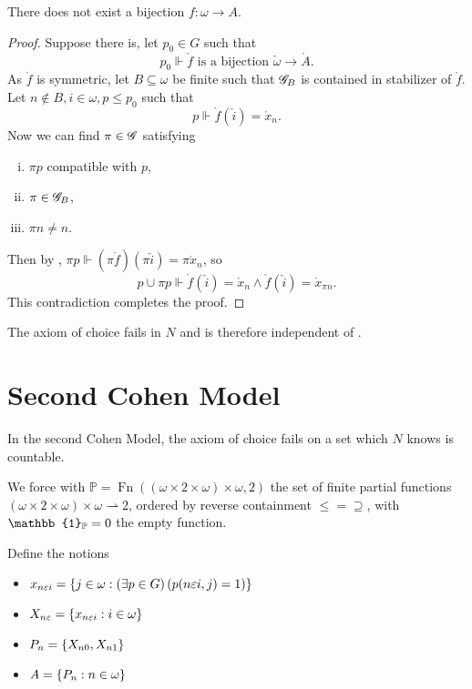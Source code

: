 \begin{lemma}
    There does not exist a bijection \(f:\omega\to A\).
\end{lemma}
\begin{proof}
Suppose there is, let \(p_0 \in G\) such that \[p_0\Vdash \mathring{f} \text{ is a bijection } \check{\omega}\to\mathring{A}. \]
As \(\mathring{f}\) is symmetric, let \(B\subseteq \omega\) be finite such that \(\mathscr{G}_B\) is contained in stabilizer of \(\mathring{f}\).
Let \(n\notin B, i\in\omega, p\leq p_0\) such that \[p\Vdash \mathring{f}(\check{i}) = \mathring{x}_n.\]
Now we can find \(\pi\in\mathscr{G}\) satisfying
\begin{enumerate}[i.]
    \item \(\pi p\) compatible with \(p\),
    \item \(\pi \in \mathscr{G}_B\),
    \item \(\pi n\ne n\).
\end{enumerate}
Then by , \(\pi p \Vdash (\pi \mathring{f})(\pi \check{i}) = \pi \mathring{x}_{n}\), so
\[p \cup \pi p \Vdash \mathring{f}(\check{i}) = \mathring{x}_n \land \mathring{f}(\check{i}) = \mathring{x}_{\pi n}. \]
This contradiction completes the proof.
\end{proof}

\begin{theorem}
    The axiom of choice fails in \(N\) and is therefore independent of \ZF.
\end{theorem}




\section{Second Cohen Model}

In the second Cohen Model, the axiom of choice fails on a set which \(N\) knows is countable.


We force with \(\mathbb{P} = \operatorname{Fn}((\omega\times 2 \times\omega)\times\omega, 2)\)
the set of finite partial functions \((\omega\times 2 \times\omega)\times\omega \rightharpoonup 2\),
ordered by reverse containment \(\leq = \supseteq\),
with \(\mathbb{1}_\P = 0\) the empty function.

Define the notions
\begin{itemize}
    \item \(x_{n\varepsilon i} = {\left\{ j\in\omega: \left(\exists p\in G\right) \left(p(n\varepsilon i, j) = 1\right)  \right\}}\)
    \item \(X_{n\varepsilon} = {\left\{ x_{n\varepsilon i}: i\in\omega \right\}}\)
    \item \(P_n = {\left\{ X_{n0}, X_{n1} \right\}}\)
    \item \(A = {\left\{ P_n:n\in\omega \right\}}\)
\end{itemize}

